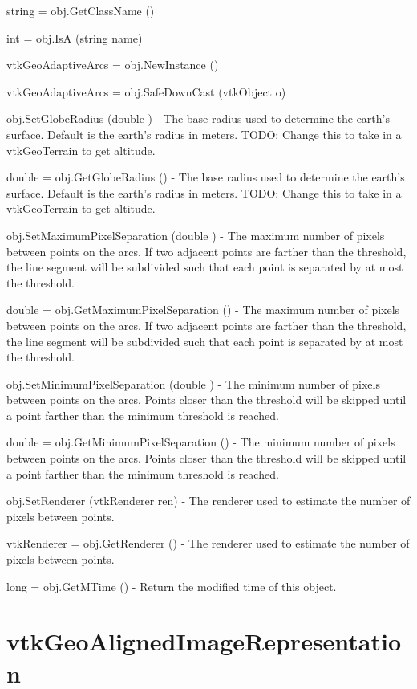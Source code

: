 \begin{DoxyItemize}
\item {\ttfamily string = obj.\-Get\-Class\-Name ()}  
\item {\ttfamily int = obj.\-Is\-A (string name)}  
\item {\ttfamily vtk\-Geo\-Adaptive\-Arcs = obj.\-New\-Instance ()}  
\item {\ttfamily vtk\-Geo\-Adaptive\-Arcs = obj.\-Safe\-Down\-Cast (vtk\-Object o)}  
\item {\ttfamily obj.\-Set\-Globe\-Radius (double )} -\/ The base radius used to determine the earth's surface. Default is the earth's radius in meters. T\-O\-D\-O\-: Change this to take in a vtk\-Geo\-Terrain to get altitude.  
\item {\ttfamily double = obj.\-Get\-Globe\-Radius ()} -\/ The base radius used to determine the earth's surface. Default is the earth's radius in meters. T\-O\-D\-O\-: Change this to take in a vtk\-Geo\-Terrain to get altitude.  
\item {\ttfamily obj.\-Set\-Maximum\-Pixel\-Separation (double )} -\/ The maximum number of pixels between points on the arcs. If two adjacent points are farther than the threshold, the line segment will be subdivided such that each point is separated by at most the threshold.  
\item {\ttfamily double = obj.\-Get\-Maximum\-Pixel\-Separation ()} -\/ The maximum number of pixels between points on the arcs. If two adjacent points are farther than the threshold, the line segment will be subdivided such that each point is separated by at most the threshold.  
\item {\ttfamily obj.\-Set\-Minimum\-Pixel\-Separation (double )} -\/ The minimum number of pixels between points on the arcs. Points closer than the threshold will be skipped until a point farther than the minimum threshold is reached.  
\item {\ttfamily double = obj.\-Get\-Minimum\-Pixel\-Separation ()} -\/ The minimum number of pixels between points on the arcs. Points closer than the threshold will be skipped until a point farther than the minimum threshold is reached.  
\item {\ttfamily obj.\-Set\-Renderer (vtk\-Renderer ren)} -\/ The renderer used to estimate the number of pixels between points.  
\item {\ttfamily vtk\-Renderer = obj.\-Get\-Renderer ()} -\/ The renderer used to estimate the number of pixels between points.  
\item {\ttfamily long = obj.\-Get\-M\-Time ()} -\/ Return the modified time of this object.  
\end{DoxyItemize}\hypertarget{vtkgeovis_vtkgeoalignedimagerepresentation}{}\section{vtk\-Geo\-Aligned\-Image\-Representation}\label{vtkgeovis_vtkgeoalignedimagerepresentation}
